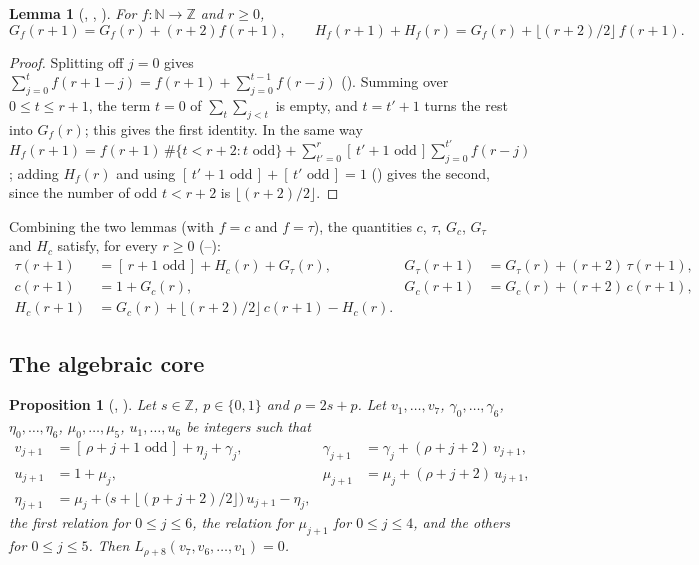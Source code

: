 \documentclass[11pt]{amsart}
\theoremstyle{plain}
\newtheorem{lemma}[theorem]{Lemma}
\newtheorem{proposition}[theorem]{Proposition}
\theoremstyle{definition}
\newcommand{\N}{\mathbb{N}}
\newcommand{\Z}{\mathbb{Z}}
\newcommand{\Iv}[1]{[\,#1\,]}
\begin{document}
\begin{lemma}[, , ]\label{lem:peel}
For $f\colon\N\to\Z$ and $r\ge0$,
\[
  G_f(r+1)=G_f(r)+(r+2)f(r+1),\qquad H_f(r+1)+H_f(r)=G_f(r)+\lfloor (r+2)/2\rfloor\, f(r+1).
\]
\end{lemma}

\begin{proof}
Splitting off $j=0$ gives $\sum_{j=0}^{t}f(r+1-j)=f(r+1)+\sum_{j=0}^{t-1}f(r-j)$ (). Summing over $0\le t\le r+1$, the term $t=0$ of $\sum_t\sum_{j<t}$ is empty, and $t=t'+1$ turns the rest into $G_f(r)$; this gives the first identity. In the same way $H_f(r+1)=f(r+1)\,\#\{t<r+2: t\text{ odd}\}+\sum_{t'=0}^{r}\Iv{t'+1\text{ odd}}\sum_{j=0}^{t'}f(r-j)$; adding $H_f(r)$ and using $\Iv{t'+1\text{ odd}}+\Iv{t'\text{ odd}}=1$ () gives the second, since the number of odd $t<r+2$ is $\lfloor(r+2)/2\rfloor$.
\end{proof}

Combining the two lemmas (with $f=c$ and $f=\tau$), the quantities $c$, $\tau$, $G_c$, $G_\tau$ and $H_c$ satisfy, for every $r\ge0$ (--):
\begin{equation}\label{eq:sys}
\begin{aligned}
  \tau(r+1)&=\Iv{r+1\text{ odd}}+H_c(r)+G_\tau(r), & G_\tau(r+1)&=G_\tau(r)+(r+2)\,\tau(r+1),\\
  c(r+1)&=1+G_c(r), & G_c(r+1)&=G_c(r)+(r+2)\,c(r+1),\\
  H_c(r+1)&=G_c(r)+\lfloor (r+2)/2\rfloor\,c(r+1)-H_c(r).
\end{aligned}
\end{equation}

\subsection{The algebraic core}

\begin{proposition}[, ]\label{prop:alg}
Let $s\in\Z$, $p\in\{0,1\}$ and $\rho=2s+p$. Let $v_1,\dots,v_7$, $\gamma_0,\dots,\gamma_6$, $\eta_0,\dots,\eta_6$, $\mu_0,\dots,\mu_5$, $u_1,\dots,u_6$ be integers such that
\begin{align*}
  v_{j+1}&=\Iv{\rho+j+1\text{ odd}}+\eta_j+\gamma_j, & \gamma_{j+1}&=\gamma_j+(\rho+j+2)\,v_{j+1},\\
  u_{j+1}&=1+\mu_j, & \mu_{j+1}&=\mu_j+(\rho+j+2)\,u_{j+1},\\
  \eta_{j+1}&=\mu_j+\bigl(s+\lfloor (p+j+2)/2\rfloor\bigr)\,u_{j+1}-\eta_j,
\end{align*}
the first relation for $0\le j\le6$, the relation for $\mu_{j+1}$ for $0\le j\le4$, and the others for $0\le j\le5$.
Then $L_{\rho+8}(v_7,v_6,\dots,v_1)=0$.
\end{proposition}
\end{document}
